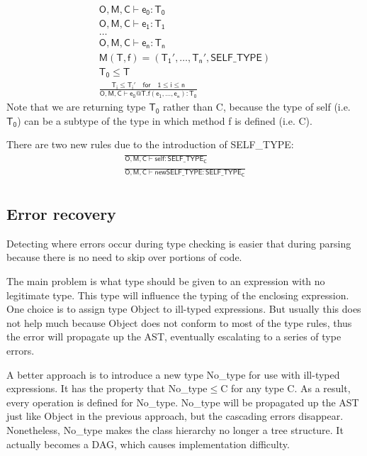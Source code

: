 \begin{gather*}
\mathsf{O,M,C\vdash e_0:T_0}\\
\mathsf{O,M,C\vdash e_1:T_1}\\
\dots\\
\mathsf{O,M,C\vdash e_n:T_n}\\
\mathsf{M(T,f) = (T_1',\dots,T_n',SELF\_TYPE)}\\
\mathsf{T_0\leq T}\\
\mathsf{\frac{T_i\leq T_i'\quad for\quad1\leq i \leq n}{O,M,C\vdash e_0@T.f(e_1,\dots,e_n): T_0}}
\end{gather*}
Note that we are returning type $\mathsf{T_0}$ rather than C, because the type of self (i.e. $\mathsf{T_0}$) can be a subtype of the type in which method f is defined (i.e. C).

There are two new rules due to the introduction of SELF\_TYPE:
\begin{gather*}
\mathsf{\frac{}{O,M,C\vdash self : SELF\_TYPE_C}}\\
\mathsf{\frac{}{O,M,C\vdash new SELF\_TYPE : SELF\_TYPE_C}}\\
\end{gather*}
\subsection{Error recovery}
Detecting where errors occur during type checking is easier that during parsing because there is no need to skip over portions of code. 

The main problem is what type should be given to an expression with no legitimate type. This type will influence the typing of the enclosing expression. One choice is to assign type Object to ill-typed expressions. But usually this does not help much because Object does not conform to most of the type rules, thus the error will propagate up the AST, eventually escalating to a series of type errors.

A better approach is to introduce a new type \textsf{No\_type} for use with ill-typed expressions. It has the property that \textsf{No\_type$\leq$C} for any type C. As a result, every operation is defined for \textsf{No\_type}. \textsf{No\_type} will be propagated up the AST just like Object in the previous approach, but the cascading errors disappear. Nonetheless, \textsf{No\_type} makes the class hierarchy no longer a tree structure. It actually becomes a DAG, which causes implementation difficulty.
\ifx\PREAMBLE\undefined

\fi